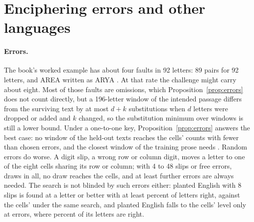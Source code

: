 \documentclass[11pt]{article}
\theoremstyle{definition}
\begin{document}
\section{Enciphering errors and other languages}\label{sec:errors}

\paragraph{Errors.} The book's worked example has about four faults in 92 letters: 89 pairs for 92 letters, and AREA written as ARYA \cite{wikipedia2026}. At that rate the challenge might carry about eight. Most of those faults are omissions, which Proposition~\ref{prop:errors} does not count directly, but a 196-letter window of the intended passage differs from the surviving text by at most $d + k$ substitutions when $d$ letters were dropped or added and $k$ changed, so the substitution minimum over windows is still a lower bound. Under a one-to-one key, Proposition~\ref{prop:errors} answers the best case: no window of the held-out texts reaches the cells' counts with fewer than \errBestFewest{} chosen errors, and the closest window of the training prose needs \corpusClosestDistance{}. Random errors do worse. A digit slip, a wrong row or column digit, moves a letter to one of the eight cells sharing its row or column; with 4 to 48 slips or free errors, \errRandomDraws{} draws in all, no draw reaches the cells, and at least \errRandomFewest{} further errors are always needed. The search is not blinded by such errors either: planted English with 8 slips is found at \errEightLow{} a letter or better with at least \errEightRight{} percent of letters right, against the cells' \errCells{} under the same search, and planted English falls to the cells' level only at \errLevel{} errors, where \errLevelRight{} percent of its letters are right.
\end{document}

